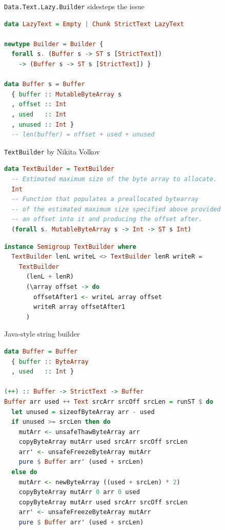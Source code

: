 \documentclass[handout]{beamer}
\begin{document}
\begin{frame}[fragile]{{\tt Data.Text.Lazy.Builder} sidesteps the issue}

\begin{lstlisting}[language=Haskell]
data LazyText = Empty | Chunk StrictText LazyText

newtype Builder = Builder {
  forall s. (Buffer s -> ST s [StrictText])
    -> (Buffer s -> ST s [StrictText]) }

data Buffer s = Buffer
  { buffer :: MutableByteArray s
  , offset :: Int
  , used   :: Int
  , unused :: Int }
  -- len(buffer) = offset + used + unused
\end{lstlisting}

\end{frame}


\begin{frame}[fragile]{{\tt TextBuilder} by Nikita Volkov}

\begin{lstlisting}[language=Haskell]
data TextBuilder = TextBuilder
  -- Estimated maximum size of the byte array to allocate.
  Int
  -- Function that populates a preallocated bytearray
  -- of the estimated maximum size specified above provided
  -- an offset into it and producing the offset after.
  (forall s. MutableByteArray s -> Int -> ST s Int)
\end{lstlisting}

\begin{lstlisting}[language=Haskell]
instance Semigroup TextBuilder where
  TextBuilder lenL writeL <> TextBuilder lenR writeR =
    TextBuilder
      (lenL + lenR)
      (\array offset -> do
        offsetAfter1 <- writeL array offset
        writeR array offsetAfter1
      )
\end{lstlisting}

\end{frame}

\begin{frame}[fragile]{Java-style string builder}

\begin{lstlisting}[language=Haskell]
data Buffer = Buffer
  { buffer :: ByteArray
  , used   :: Int }

(++) :: Buffer -> StrictText -> Buffer
Buffer arr used ++ Text srcArr srcOff srcLen = runST $ do
  let unused = sizeofByteArray arr - used
  if unused >= srcLen then do
    mutArr <- unsafeThawByteArray arr
    copyByteArray mutArr used srcArr srcOff srcLen
    arr' <- unsafeFreezeByteArray mutArr
    pure $ Buffer arr' (used + srcLen)
  else do
    mutArr <- newByteArray ((used + srcLen) * 2)
    copyByteArray mutArr 0 arr 0 used
    copyByteArray mutArr used srcArr srcOff srcLen
    arr' <- unsafeFreezeByteArray mutArr
    pure $ Buffer arr' (used + srcLen)
\end{lstlisting}

\end{frame}
\end{document}

